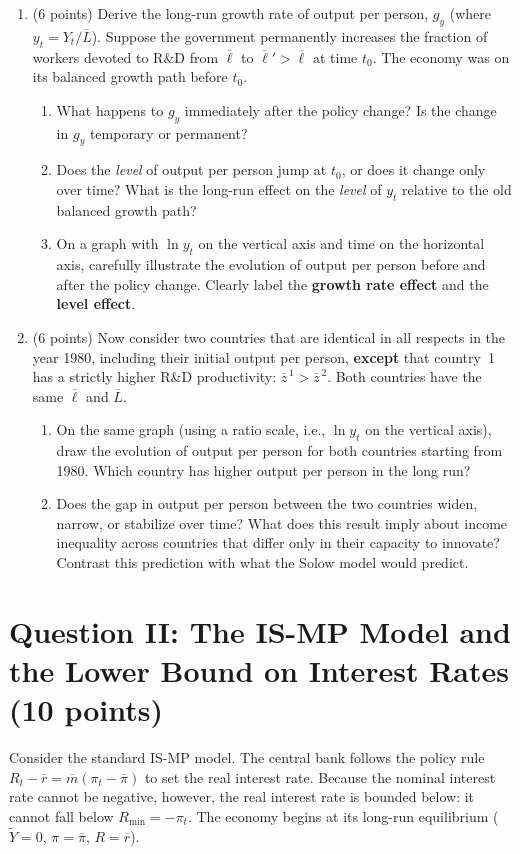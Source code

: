 \documentclass[letterpaper,12pt]{article}
\theoremstyle{dotlessS}
\begin{document}
\begin{enumerate}[label=(\alph*)]
\item (6 points) Derive the long-run growth rate of output per person, $g_y$ (where $y_t = Y_t/\overline{L}$). Suppose the government permanently increases the fraction of workers devoted to R\&D from $\overline{\ell}$ to $\overline{\ell}' > \overline{\ell}$ at time $t_0$. The economy was on its balanced growth path before $t_0$.
\begin{enumerate}[label=\roman*.]
    \item What happens to $g_y$ immediately after the policy change? Is the change in $g_y$ temporary or permanent?
    \item Does the \emph{level} of output per person jump at $t_0$, or does it change only over time? What is the long-run effect on the \emph{level} of $y_t$ relative to the old balanced growth path?
    \item On a graph with $\ln y_t$ on the vertical axis and time on the horizontal axis, carefully illustrate the evolution of output per person before and after the policy change. Clearly label the \textbf{growth rate effect} and the \textbf{level effect}.
\end{enumerate}
\item (6 points) Now consider two countries that are identical in all respects in the year 1980, including their initial output per person, \textbf{except} that country~1 has a strictly higher R\&D productivity: $\overline{z}^{\,1} > \overline{z}^{\,2}$. Both countries have the same $\overline{\ell}$ and $\overline{L}$.
\begin{enumerate}[label=\roman*.]
    \item On the same graph (using a ratio scale, i.e., $\ln y_t$ on the vertical axis), draw the evolution of output per person for both countries starting from 1980. Which country has higher output per person in the long run?
    \item Does the gap in output per person between the two countries widen, narrow, or stabilize over time? What does this result imply about income inequality across countries that differ only in their capacity to innovate? Contrast this prediction with what the Solow model would predict.
\end{enumerate}
\end{enumerate}


\section*{Question II: The IS-MP Model and the Lower Bound on Interest Rates (10 points)}
Consider the standard IS-MP model. The central bank follows the policy rule $R_t - \overline{r} = \overline{m}(\pi_t - \overline{\pi})$ to set the real interest rate. Because the nominal interest rate cannot be negative, however, the real interest rate is bounded below: it cannot fall below $R_{\min} = -\pi_t$. The economy begins at its long-run equilibrium ($\widetilde{Y} = 0$, $\pi = \overline{\pi}$, $R = \overline{r}$).
\end{document}
